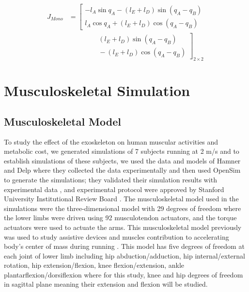 \documentclass[10pt,letterpaper]{article}
\begin{document}
\begin{equation}\label{Eqn_Mono_Jacobian}
\begin{aligned}
J_{Mono}&=
\left[\begin{matrix}
-l_{A}\sin{q_{A}}- (l_ {E} + l_ {D})\sin (q_ {A} - q_ {B})\\
l_{A}\cos{q_{A}} + (l_{E} + l_{D})\cos (q_{A} - q_ {B})
\end{matrix}\right.\\
&\qquad\qquad
\left.\begin{matrix}
{} (l_ {E} + l_ {D})\sin (q_ {A} - q_ {B})\\
{} - (l_ {E} + l_ {D})\cos (q_ {A} - q_ {B})
\end{matrix}\right]_{2\times 2}
\end{aligned}
\end{equation}
\section*{Musculoskeletal Simulation}
\subsection*{Musculoskeletal Model}
To study the effect of the exoskeleton on human muscular activities and metabolic cost, we generated simulations of 7 subjects running at 2 m/s and to establish simulations of these subjects, we used the data and models of Hamner and Delp\cite{101} where they  collected the data experimentally and then used OpenSim to generate the simulations; they validated their simulation results with experimental data \cite{101}, and experimental protocol were approved by Stanford University Institutional Review Board \cite{2}. The musculoskeletal model used in the simulations were the three-dimensional model with 29 degrees of freedom where the lower limbs were driven using 92 musculotendon actuators, and the torque actuators were used to actuate the arms. This musculoskeletal model previously was used to study assistive devices \cite{2} and muscles contribution to accelerating body's center of mass during running \cite{101,102}. This model has five degrees of freedom at each joint of lower limb including hip abduction/adduction, hip internal/external rotation, hip extension/flexion, knee flexion/extension, ankle plantarflexion/dorsiflexion where  for this study, knee and hip degrees of freedom in sagittal plane meaning their extension and flexion will be studied.\\
\end{document}
